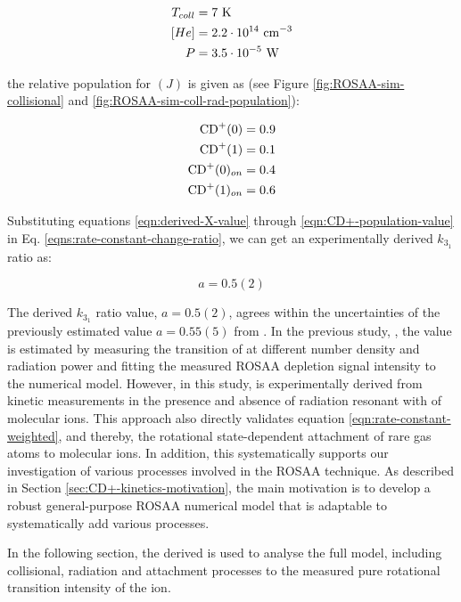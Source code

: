 \begin{align*}
    T_{coll} & = 7\ \text{K}                      \\
    [He]     & = 2.2 \cdot 10^{14}\ \text{cm$^{-3}$} \\
    P        & = 3.5 \cdot 10^{-5}\ \text{W}
\end{align*}

the relative population for \CD$(J)$ is given as (see Figure
\ref{fig:ROSAA-sim-collisional} and \ref{fig:ROSAA-sim-coll-rad-population}):

\begin{align}
    \text{CD}^+(0)      & = 0.9                                  \\
    \text{CD}^+(1)      & = 0.1                                  \\
    \text{CD}^+(0)_{on} & = 0.4                                  \\
    \text{CD}^+(1)_{on} & = 0.6 \label{eqn:CD+-population-value}
\end{align}

Substituting equations \ref{eqn:derived-X-value} through
\ref{eqn:CD+-population-value} in Eq. \ref{eqns:rate-constant-change-ratio}, we
can get an experimentally derived $k_{3_1}$ ratio as:

\begin{equation}
    a = 0.5(2)
    \label{eqn:k31-ratio}
\end{equation}

The derived $k_{3_1}$ ratio value, $a=0.5(2)$, agrees within the uncertainties of the previously
estimated value $a=0.55(5)$ from \citet{Brunken2017}. In the previous study,
\cite{Brunken2017}, the  value is estimated by measuring the \CDline
transition of \CD at different number density and radiation power and fitting
the measured ROSAA depletion signal intensity to the numerical model. However,
in this study,  is experimentally derived from kinetic measurements
in the presence and absence of radiation resonant with \CDline of \CD molecular
ions. This approach also directly validates equation
\ref{eqn:rate-constant-weighted}, and thereby, the rotational state-dependent
attachment of rare gas atoms to molecular ions. In addition, this
systematically supports our investigation of various processes involved in the
ROSAA technique. As described in Section \ref{sec:CD+-kinetics-motivation},
the main motivation is to develop a robust general-purpose ROSAA numerical
model that is adaptable to systematically add various processes.

In the following section, the derived  is used to analyse the full
model, including collisional, radiation and attachment processes to the measured
pure rotational transition intensity of the \CD ion.

